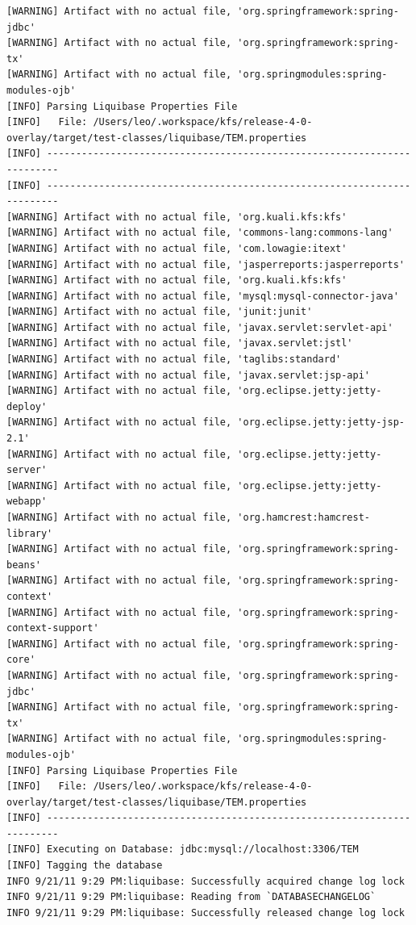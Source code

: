 \documentclass[12pt,notitlepage]{article}
\begin{document}
\begin{lstlisting}
[WARNING] Artifact with no actual file, 'org.springframework:spring-jdbc'
[WARNING] Artifact with no actual file, 'org.springframework:spring-tx'
[WARNING] Artifact with no actual file, 'org.springmodules:spring-modules-ojb'
[INFO] Parsing Liquibase Properties File
[INFO]   File: /Users/leo/.workspace/kfs/release-4-0-overlay/target/test-classes/liquibase/TEM.properties
[INFO] ------------------------------------------------------------------------
[INFO] ------------------------------------------------------------------------
[WARNING] Artifact with no actual file, 'org.kuali.kfs:kfs'
[WARNING] Artifact with no actual file, 'commons-lang:commons-lang'
[WARNING] Artifact with no actual file, 'com.lowagie:itext'
[WARNING] Artifact with no actual file, 'jasperreports:jasperreports'
[WARNING] Artifact with no actual file, 'org.kuali.kfs:kfs'
[WARNING] Artifact with no actual file, 'mysql:mysql-connector-java'
[WARNING] Artifact with no actual file, 'junit:junit'
[WARNING] Artifact with no actual file, 'javax.servlet:servlet-api'
[WARNING] Artifact with no actual file, 'javax.servlet:jstl'
[WARNING] Artifact with no actual file, 'taglibs:standard'
[WARNING] Artifact with no actual file, 'javax.servlet:jsp-api'
[WARNING] Artifact with no actual file, 'org.eclipse.jetty:jetty-deploy'
[WARNING] Artifact with no actual file, 'org.eclipse.jetty:jetty-jsp-2.1'
[WARNING] Artifact with no actual file, 'org.eclipse.jetty:jetty-server'
[WARNING] Artifact with no actual file, 'org.eclipse.jetty:jetty-webapp'
[WARNING] Artifact with no actual file, 'org.hamcrest:hamcrest-library'
[WARNING] Artifact with no actual file, 'org.springframework:spring-beans'
[WARNING] Artifact with no actual file, 'org.springframework:spring-context'
[WARNING] Artifact with no actual file, 'org.springframework:spring-context-support'
[WARNING] Artifact with no actual file, 'org.springframework:spring-core'
[WARNING] Artifact with no actual file, 'org.springframework:spring-jdbc'
[WARNING] Artifact with no actual file, 'org.springframework:spring-tx'
[WARNING] Artifact with no actual file, 'org.springmodules:spring-modules-ojb'
[INFO] Parsing Liquibase Properties File
[INFO]   File: /Users/leo/.workspace/kfs/release-4-0-overlay/target/test-classes/liquibase/TEM.properties
[INFO] ------------------------------------------------------------------------
[INFO] Executing on Database: jdbc:mysql://localhost:3306/TEM
[INFO] Tagging the database
INFO 9/21/11 9:29 PM:liquibase: Successfully acquired change log lock
INFO 9/21/11 9:29 PM:liquibase: Reading from `DATABASECHANGELOG`
INFO 9/21/11 9:29 PM:liquibase: Successfully released change log lock

\end{lstlisting}
\end{document}
